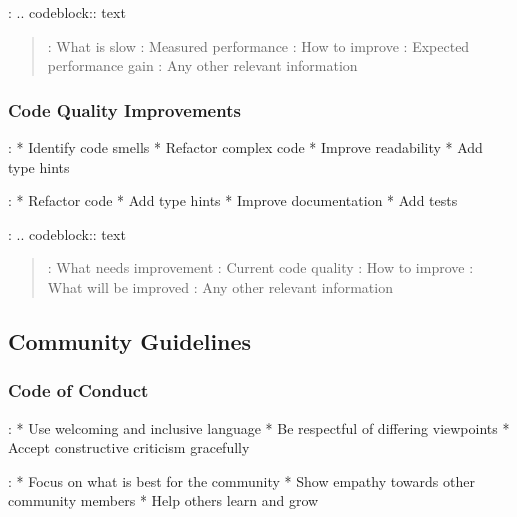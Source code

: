 \documentclass[a4paper,10pt,english,openany,oneside]{sphinxmanual}
\begin{document}
\sphinxAtStartPar
{}:
.. code\sphinxhyphen{}block:: text
\begin{quote}

\sphinxAtStartPar
{}: What is slow
: Measured performance
: How to improve
: Expected performance gain
: Any other relevant information
\end{quote}


\subsubsection{Code Quality Improvements}
\label{\detokenize{contributing:code-quality-improvements}}
\sphinxAtStartPar
{}:
* Identify code smells
* Refactor complex code
* Improve readability
* Add type hints

\sphinxAtStartPar
{}:
* Refactor code
* Add type hints
* Improve documentation
* Add tests

\sphinxAtStartPar
{}:
.. code\sphinxhyphen{}block:: text
\begin{quote}

\sphinxAtStartPar
{}: What needs improvement
: Current code quality
: How to improve
: What will be improved
: Any other relevant information
\end{quote}


\subsection{Community Guidelines}
\label{\detokenize{contributing:community-guidelines}}

\subsubsection{Code of Conduct}
\label{\detokenize{contributing:code-of-conduct}}
\sphinxAtStartPar
{}:
* Use welcoming and inclusive language
* Be respectful of differing viewpoints
* Accept constructive criticism gracefully

\sphinxAtStartPar
{}:
* Focus on what is best for the community
* Show empathy towards other community members
* Help others learn and grow
\end{document}

